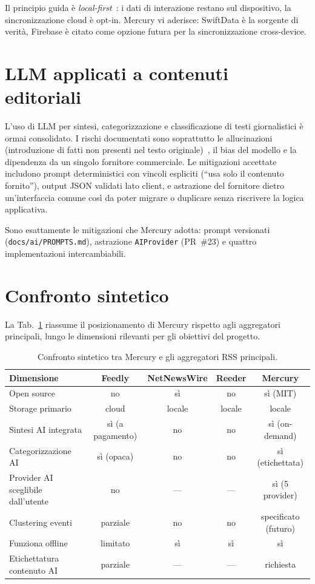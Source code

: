 Il principio guida è \emph{local-first}~\cite{kleppmann2019localfirst}: i dati
di interazione restano sul dispositivo, la sincronizzazione cloud è opt-in. Mercury vi aderisce:
SwiftData è la sorgente di verità, Firebase è citato come opzione
futura per la sincronizzazione cross-device.

\section{LLM applicati a contenuti editoriali}
L'uso di LLM per sintesi, categorizzazione e classificazione di testi
giornalistici è ormai consolidato. I rischi documentati sono soprattutto le
allucinazioni (introduzione di fatti non presenti nel testo
originale)~\cite{ji2023hallucination}, il bias
del modello e la dipendenza da un singolo fornitore commerciale. Le mitigazioni
accettate includono prompt deterministici con vincoli espliciti
(``usa solo il contenuto fornito''), output JSON validati lato client, e
astrazione del fornitore dietro un'interfaccia comune così da poter migrare o
duplicare senza riscrivere la logica applicativa.

Sono esattamente le mitigazioni che Mercury adotta: prompt versionati
(\texttt{docs/ai/PROMPTS.md}), astrazione \texttt{AIProvider} (PR~\#23) e
quattro implementazioni intercambiabili.

\section{Confronto sintetico}
La Tab.~\ref{tab:confronto-aggregatori} riassume il posizionamento di Mercury
rispetto agli aggregatori principali, lungo le dimensioni rilevanti per gli
obiettivi del progetto.

\begin{table}[h]
\centering
\small
\caption{Confronto sintetico tra Mercury e gli aggregatori RSS principali.}
\label{tab:confronto-aggregatori}
\begin{tabular}{lcccc}
\toprule
\textbf{Dimensione} & \textbf{Feedly} & \textbf{NetNewsWire} & \textbf{Reeder} & \textbf{Mercury} \\
\midrule
Open source                    & no  & sì  & no  & sì (MIT) \\
Storage primario               & cloud & locale & locale & locale \\
Sintesi AI integrata           & sì (a pagamento) & no & no & sì (on-demand) \\
Categorizzazione AI            & sì (opaca) & no & no & sì (etichettata) \\
Provider AI scegli\-bile dall'utente & no & --- & --- & sì (5 provider) \\
Clustering eventi              & parziale & no & no & specificato (futuro) \\
Funziona offline               & limitato & sì & sì & sì \\
Etichettatura contenuto AI     & parziale & --- & --- & richiesta \\
\bottomrule
\end{tabular}
\end{table}

